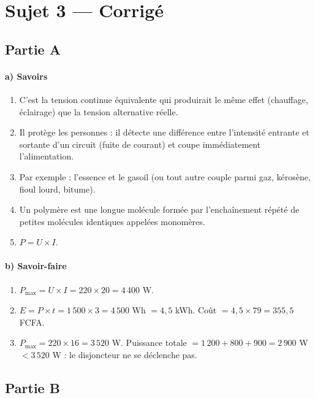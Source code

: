 \section{Sujet 3 — Corrigé}

\subsection*{Partie A}

\paragraph{a) Savoirs}
\begin{enumerate}[label=\arabic*)]
\item C'est la tension continue équivalente qui produirait le même effet (chauffage,
éclairage) que la tension alternative réelle.
\item Il protège les personnes : il détecte une différence entre l'intensité entrante et
sortante d'un circuit (fuite de courant) et coupe immédiatement l'alimentation.
\item Par exemple : l'essence et le gasoil (ou tout autre couple parmi gaz, kérosène,
fioul lourd, bitume).
\item Un polymère est une longue molécule formée par l'enchaînement répété de petites
molécules identiques appelées monomères.
\item $P=U\times I$.
\end{enumerate}

\paragraph{b) Savoir-faire}
\begin{enumerate}[label=\arabic*)]
\item $P_{\max}=U\times I=220\times20=4\,400$ W.
\item $E=P\times t=1\,500\times3=4\,500$ Wh $=4{,}5$ kWh. Coût $=4{,}5\times79=355{,}5$
FCFA.
\item $P_{\max}=220\times16=3\,520$ W. Puissance totale $=1\,200+800+900=2\,900$ W
$<3\,520$ W : le disjoncteur ne se déclenche pas.
\end{enumerate}

\subsection*{Partie B}

